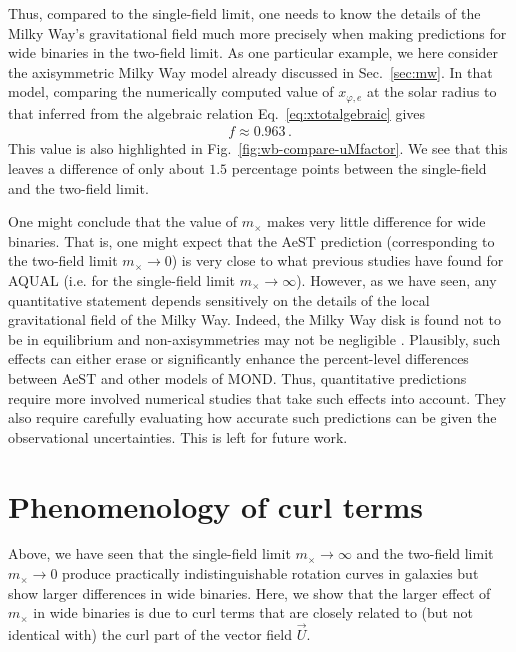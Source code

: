 \documentclass[reprint, amsmath,amssymb, nofootinbib, aps, prd]{revtex4-2}
\begin{document}
Thus, compared to the single-field limit, one needs to know the details of the Milky Way's gravitational field much more precisely when making predictions for wide binaries in the two-field limit.
As one particular example, we here consider the axisymmetric Milky Way model already discussed in Sec.~\ref{sec:mw}.
In that model, comparing the numerically computed value of $x_{\varphi,e}$ at the solar radius to that inferred from the algebraic relation Eq.~\eqref{eq:xtotalgebraic} gives
\begin{align}
 f \approx 0.963 \,.
\end{align}
This value is also highlighted in Fig.~\ref{fig:wb-compare-uMfactor}.
We see that this leaves a difference of only about $1.5$ percentage points between the single-field and the two-field limit.

One might conclude that the value of $m_\times$ makes very little difference for wide binaries.
That is, one might expect that the AeST prediction (corresponding to the two-field limit $m_\times \to 0$) is very close to what previous studies have found for AQUAL (i.e. for the single-field limit $m_\times \to \infty$).
However, as we have seen, any quantitative statement depends sensitively on the details of the local gravitational field of the Milky Way.
Indeed, the Milky Way disk is found not to be in equilibrium and non-axisymmetries may not be negligible \citep{Antoja2018,Faure2014,McGaugh2019b}.
Plausibly, such effects can either erase or significantly enhance the percent-level differences between AeST and other models of MOND.
Thus, quantitative predictions require more involved numerical studies that take such effects into account.
They also require carefully evaluating how accurate such predictions can be given the observational uncertainties.
This is left for future work.

\section{Phenomenology of curl terms}
\label{sec:curlpheno}

Above, we have seen that the single-field limit $m_\times \to \infty$ and the two-field limit $m_\times \to 0$ produce practically indistinguishable rotation curves in galaxies but show larger differences in wide binaries.
Here, we show that the larger effect of $m_\times$ in wide binaries is due to curl terms that are closely related to (but not identical with) the curl part of the vector field $\vec{U}$.
\end{document}
